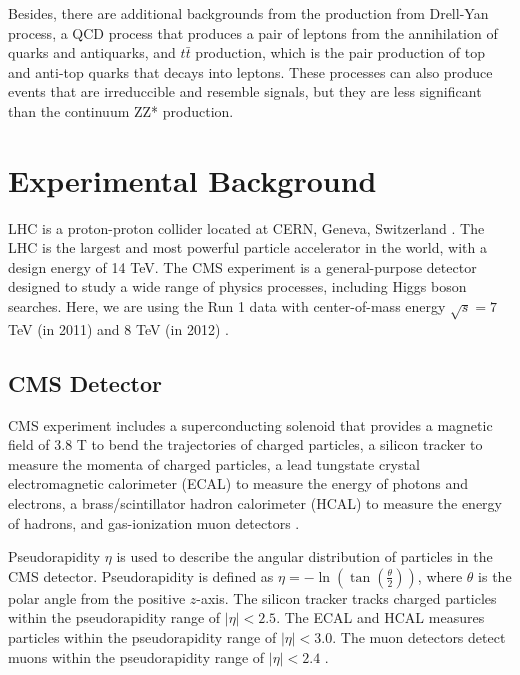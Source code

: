 Besides, there are additional backgrounds from the production from Drell-Yan process, a QCD process that produces a pair of leptons from the annihilation of quarks and antiquarks, and $t\bar{t}$ production, which is the pair production of top and anti-top quarks that decays into leptons. 
These processes can also produce events that are irreduccible and resemble signals, but they are less significant than the continuum ZZ* production. 


\section{Experimental Background}
LHC is a proton-proton collider located at CERN, Geneva, Switzerland \cite{CMS:2012qbp}. The LHC is the largest and most powerful particle accelerator in the world, with a design energy of 14 TeV. The CMS experiment is a general-purpose detector designed to study a wide range of physics processes, including Higgs boson searches. Here, we are using the Run 1 data with center-of-mass energy $\sqrt{s} = 7$ TeV (in 2011) and $8$ TeV (in 2012) \cite{CMS_2010_data,MIT:Higgs4L2020,Hu2020HiggsTo4L,CMS:2012qbp}.

\subsection{CMS Detector}
CMS experiment includes a superconducting solenoid that provides a magnetic field of 3.8 T to bend the trajectories of charged particles, a silicon tracker to measure the momenta of charged particles, a lead tungstate crystal electromagnetic calorimeter (ECAL) to measure the energy of photons and electrons, a brass/scintillator hadron calorimeter (HCAL) to measure the energy of hadrons, and gas-ionization muon detectors \cite{CMS:2012qbp}. 

Pseudorapidity $\eta$ is used to describe the angular distribution of particles in the CMS detector. Pseudorapidity is defined as $\eta=-\ln(\tan(\frac{\theta}{2}))$, where $\theta$ is the polar angle from the positive $z$-axis. The silicon tracker tracks charged particles within the pseudorapidity range of $|\eta| < 2.5$. The ECAL and HCAL measures particles within the pseudorapidity range of $|\eta| < 3.0$. The muon detectors detect muons within the pseudorapidity range of $|\eta| < 2.4$ \cite{CMS:2012qbp}. 


